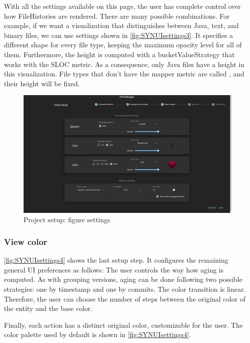With all the settings available on this page, the user has complete control over how FileHistories are rendered. 
There are many possible combinations. For example, if we want a visualization that distinguishes between Java, text, and binary files, we can use settings shown in \autoref{fig:SYNUIsettings3}. It specifies a different shape for every file type, keeping the maximum opacity level for all of them. Furthermore, the height is computed with a bucketValueStrategy that works with the SLOC metric. As a consequence, only Java files have a height in this visualization. File types that don't have the mapper metric are called , and their height will be fixed. 



\begin{figure}
    \center
    \includegraphics[width=\textwidth]{SYNUI-settings3.png}
    \caption{Project setup: figure settings}
    \label{fig:SYNUIsettings3}
\end{figure}

\subsubsection*{View color}

\autoref{fig:SYNUIsettings4} shows the last setup step. It configures the remaining general UI preferences as follows:
The user controls the way how aging is computed. 
As with grouping versions, aging can be done following two possible strategies: one by timestamp and one by commits. 
The color transition is linear. Therefore, the user can choose the number of steps between the original color of the entity and the base color. 

Finally, each action has a distinct original color, customizable for the user. The color palette used by default is shown in \autoref{fig:SYNUIsettings4}.

